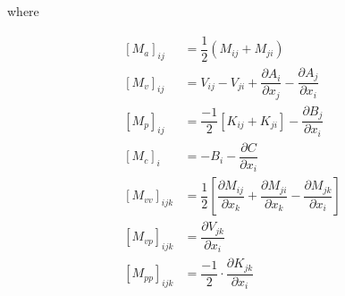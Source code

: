 \documentclass[a4paper]{article}
\begin{document}
where

\begin{align}
\left[M_{a}\right]_{ij} & = \dfrac{1}{2} \left(M_{ij}+M_{ji}\right) \\
\left[M_{v}\right]_{ij} & = V_{ij} - V_{ji} + \dfrac{\partial A_{i}}{\partial x_{j}} - \dfrac{\partial A_{j}}{\partial x_{i}} \\
\left[M_{p}\right]_{ij} & = \dfrac{-1}{2}\left[K_{ij}+K_{ji}\right] - \dfrac{\partial B_{j}}{\partial x_{i}} \\
\left[M_{c}\right]_{i} & = -B_{i} -\dfrac{\partial C}{\partial x_{i}} \\
\left[M_{vv}\right]_{ijk} & = \dfrac{1}{2}\left[\dfrac{\partial M_{ij}}{\partial x_{k}} + \dfrac{\partial M_{ji}}{\partial x_{k}} - \dfrac{\partial M_{jk}}{\partial x_{i}}\right] \\
\left[M_{vp}\right]_{ijk} & = \dfrac{\partial V_{jk}}{\partial x_{i}} \\
\left[M_{pp}\right]_{ijk} & = \dfrac{-1}{2} \cdot \dfrac{\partial K_{jk}}{\partial x_{i}}
\end{align}

 
\end{document}
